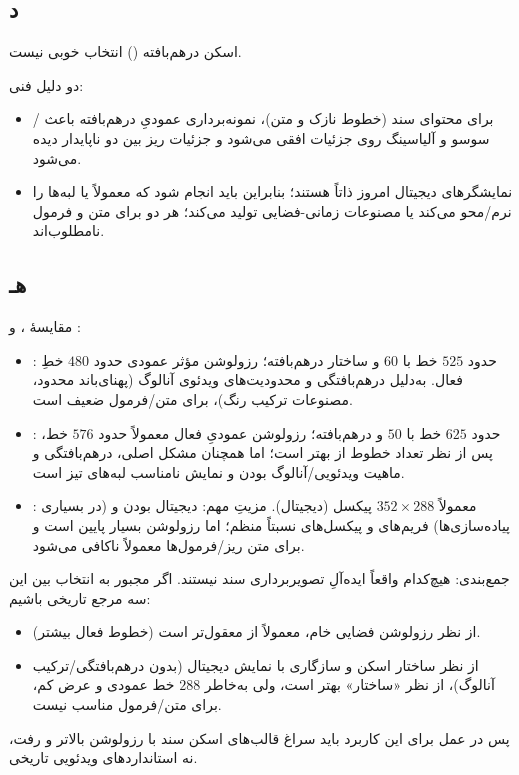 \subsection*{د}
اسکن درهم‌بافته () انتخاب خوبی نیست.

دو دلیل فنی:
\begin{itemize}
    \item برای محتوای سند (خطوط نازک و متن)، نمونه‌برداری عمودیِ درهم‌بافته باعث  / سوسو و آلیاسینگ روی جزئیات افقی می‌شود و جزئیات ریز بین دو  ناپایدار دیده می‌شود.
    \item نمایشگرهای دیجیتال امروز ذاتاً  هستند؛ بنابراین باید  انجام شود که معمولاً یا لبه‌ها را نرم/محو می‌کند یا مصنوعات زمانی-فضایی تولید می‌کند؛ هر دو برای متن و فرمول نامطلوب‌اند.
\end{itemize}

\subsection*{هـ}
مقایسهٔ ،  و :
\begin{itemize}
    \item {}: حدود $525$ خط با $60$  و ساختار درهم‌بافته؛ رزولوشن مؤثر عمودی حدود $480$ خطِ فعال. به‌دلیل درهم‌بافتگی و محدودیت‌های ویدئوی آنالوگ (پهنای‌باند محدود، مصنوعات ترکیب رنگ)، برای متن/فرمول ضعیف است.
    \item {}: حدود $625$ خط با $50$  و درهم‌بافته؛ رزولوشن عمودیِ فعال معمولاً حدود $576$ خط، پس از نظر تعداد خطوط از  بهتر است؛ اما همچنان مشکل اصلی، درهم‌بافتگی و ماهیت ویدئویی/آنالوگ بودن و نمایش نامناسب لبه‌های تیز است.
    \item {}: معمولاً $352 \times 288$ پیکسل (دیجیتال). مزیتِ مهم: دیجیتال بودن و (در بسیاری پیاده‌سازی‌ها) فریم‌های  و پیکسل‌های نسبتاً منظم؛ اما رزولوشن بسیار پایین است و برای متن ریز/فرمول‌ها معمولاً ناکافی می‌شود.
\end{itemize}

جمع‌بندی: هیچ‌کدام واقعاً ایده‌آلِ تصویربرداری سند نیستند. اگر مجبور به انتخاب بین این سه مرجع تاریخی باشیم:
\begin{itemize}
    \item از نظر رزولوشن فضایی خام،  معمولاً از  معقول‌تر است (خطوط فعال بیشتر).
    \item از نظر ساختار اسکن و سازگاری با نمایش دیجیتال (بدون درهم‌بافتگی/ترکیب آنالوگ)،  از نظر «ساختار» بهتر است، ولی به‌خاطر $288$ خط عمودی و عرض کم، برای متن/فرمول مناسب نیست.
\end{itemize}
پس در عمل برای این کاربرد باید سراغ قالب‌های اسکن سند با رزولوشن بالاتر و  رفت، نه استانداردهای ویدئویی تاریخی.